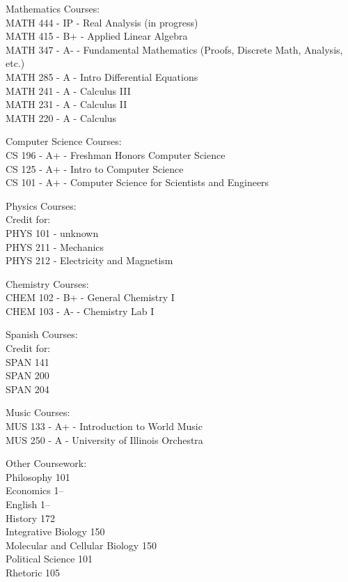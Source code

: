 \documentclass[12pt]{article}
\begin{document}
Mathematics Courses:\\
MATH 444 - IP - Real Analysis (in progress)\\
MATH 415 - B+ - Applied Linear Algebra\\
MATH 347 - A- - Fundamental Mathematics (Proofs, Discrete Math, Analysis, etc.)\\
MATH 285 - A  - Intro Differential Equations\\
MATH 241 - A  - Calculus III\\
MATH 231 - A  - Calculus II\\
MATH 220 - A  - Calculus

Computer Science Courses:\\
CS 196 - A+ - Freshman Honors Computer Science\\
CS 125 - A+ - Intro to Computer Science\\
CS 101 - A+ - Computer Science for Scientists and Engineers

Physics Courses:\\
	Credit for:\\
	PHYS 101 - unknown\\
	PHYS 211 - Mechanics\\
	PHYS 212 - Electricity and Magnetism

Chemistry Courses:\\
CHEM 102 - B+ - General Chemistry I\\
CHEM 103 - A- - Chemistry Lab I

Spanish Courses:\\
	Credit for:\\
	SPAN 141\\
	SPAN 200\\
	SPAN 204

Music Courses:\\
MUS 133 - A+ - Introduction to World Music\\
MUS 250 - A  - University of Illinois Orchestra

Other Coursework:\\
Philosophy 101\\
Economics 1--\\
English 1--\\
History 172\\
Integrative Biology 150\\
Molecular and Cellular Biology 150\\
Political Science 101\\
Rhetoric 105
\end{document}
